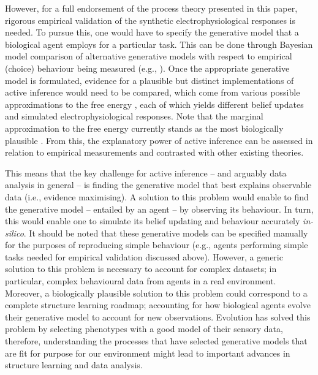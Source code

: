 \documentclass[review,12pt,authoryear]{elsarticle}
\begin{document}
However, for a full endorsement of the process theory presented in this paper, rigorous empirical validation of the synthetic electrophysiological responses is needed. To pursue this, one would have to specify the generative model that a biological agent employs for a particular task. This can be done through Bayesian model comparison of alternative generative models with respect to empirical (choice) behaviour being measured (e.g., \citep{mirzaHumanVisualExploration2018}). Once the appropriate generative model is formulated, evidence for a plausible but distinct implementations of active inference would need to be compared, which come from various possible approximations to the free energy \citep{parrNeuronalMessagePassing2019,schwobelActiveInferenceBelief2018,yedidiaConstructingFreeEnergyApproximations2005}, each of which yields different belief updates and simulated electrophysiological responses. Note that the marginal approximation to the free energy currently stands as the most biologically plausible \citep{parrNeuronalMessagePassing2019}. From this, the explanatory power of active inference can be assessed in relation to empirical measurements and contrasted with other existing theories.

This means that the key challenge for active inference -- and arguably data analysis in general -- is finding the generative model that best explains observable data (i.e., evidence maximising). A solution to this problem would enable to find the generative model -- entailed by an agent -- by observing its behaviour. In turn, this would enable one to simulate its belief updating and behaviour accurately \textit{in-silico}. It should be noted that these generative models can be specified manually for the purposes of reproducing simple behaviour (e.g., agents performing simple tasks needed for empirical validation discussed above). However, a generic solution to this problem is necessary to account for complex datasets; in particular, complex behavioural data from agents in a real environment. Moreover, a biologically plausible solution to this problem could correspond to a complete structure learning roadmap; accounting for how biological agents evolve their generative model to account for new observations. Evolution has solved this problem by selecting phenotypes with a good model of their sensory data, therefore, understanding the processes that have selected generative models that are fit for purpose for our environment might lead to important advances in structure learning and data analysis.
\end{document}
